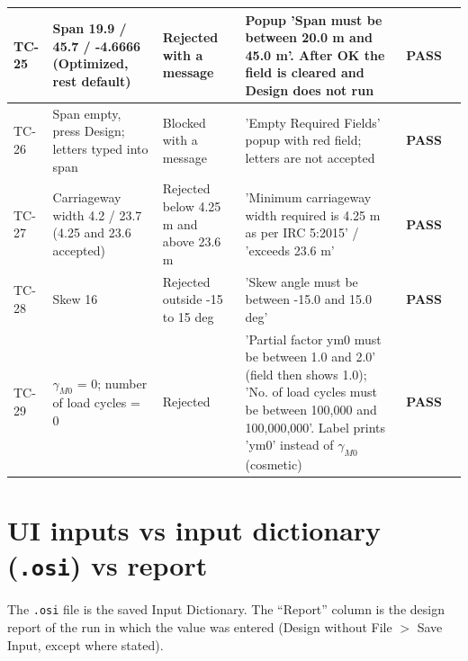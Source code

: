 \documentclass[10pt,a4paper]{article}
\begin{document}
{\begin{longtable}{|p{1.2cm}|p{6.2cm}|p{3.6cm}|p{7.2cm}|p{1.8cm}|p{3.6cm}|}
TC-25 & Span 19.9 / 45.7 / -4.6666 (Optimized, rest default) & Rejected with a message & Popup 'Span must be between 20.0 m and 45.0 m'. After OK the field is cleared and Design does not run & \textcolor{passc}{\textbf{PASS}} &  \\ \hline
TC-26 & Span empty, press Design; letters typed into span & Blocked with a message & 'Empty Required Fields' popup with red field; letters are not accepted & \textcolor{passc}{\textbf{PASS}} &  \\ \hline
TC-27 & Carriageway width 4.2 / 23.7 (4.25 and 23.6 accepted) & Rejected below 4.25 m and above 23.6 m & 'Minimum carriageway width required is 4.25 m as per IRC 5:2015' / 'exceeds 23.6 m' & \textcolor{passc}{\textbf{PASS}} &  \\ \hline
TC-28 & Skew 16 & Rejected outside -15 to 15 deg & 'Skew angle must be between -15.0 and 15.0 deg' & \textcolor{passc}{\textbf{PASS}} &  \\ \hline
TC-29 & $\gamma_{M0}$ = 0; number of load cycles = 0 & Rejected & 'Partial factor ym0 must be between 1.0 and 2.0' (field then shows 1.0); 'No. of load cycles must be between 100,000 and 100,000,000'. Label prints 'ym0' instead of $\gamma_{M0}$ (cosmetic) & \textcolor{passc}{\textbf{PASS}} &  \\ \hline
\end{longtable}}

\section{UI inputs vs input dictionary (\texttt{.osi}) vs report}
The \texttt{.osi} file is the saved Input Dictionary. The ``Report'' column is the design report of the run in which the value was entered (Design without File $>$ Save Input, except where stated).
\end{document}
